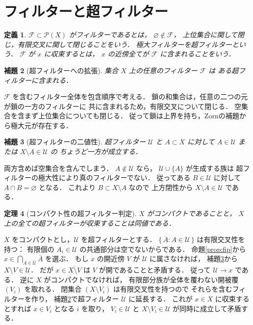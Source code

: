 \documentclass[a5paper,10pt,onecolumn]{jsarticle}
\makeatletter
\theoremstyle{mathnotetheorem}
\newtheorem{theorem}{定理}[section]
\newtheorem{definition}[theorem]{定義}
\newtheorem{lemma}[theorem]{補題}
\renewcommand{\proofname}{証明}
\renewenvironment{proof}[1][\proofname]{%
  \par\pushQED{\qed}\normalfont\topsep4\p@\@plus2\p@\relax
  \trivlist\item[\hskip\labelsep\bfseries #1]\ignorespaces
}{\popQED\endtrivlist\@endpefalse}
\makeatother
\begin{document}
\section{フィルターと超フィルター}
\begin{definition}
$\mathcal F\subset\mathcal P(X)$ がフィルターであるとは，
$\varnothing\notin\mathcal F$，
上位集合に関して閉じ，有限交叉に関して閉じることをいう．
極大フィルターを超フィルターという．
$\mathcal F$ が $x$ に収束するとは，
$x$ の近傍全てが $\mathcal F$ に含まれることをいう．
\end{definition}
\begin{lemma}[超フィルターへの拡張]\label{lem:ultra}
集合 $X$ 上の任意のフィルター $\mathcal F$ は
ある超フィルターに含まれる．
\end{lemma}
\begin{proof}
$\mathcal F$ を含むフィルター全体を包含順序で考える．
鎖の和集合は，任意の二つの元が鎖の一方のフィルターに
共に含まれるため，有限交叉について閉じる．
空集合を含まず上位集合についても閉じる．
従って鎖は上界を持ち，Zornの補題から極大元が存在する．
\end{proof}
\begin{lemma}[超フィルターの二値性]\label{lem:dichotomy}
超フィルター $\mathcal U$ と $A\subset X$ に対して
$A\in\mathcal U$ または $X\setminus A\in\mathcal U$ の
ちょうど一方が成立する．
\end{lemma}
\begin{proof}
両方含めば空集合を含んでしまう．
$A\notin\mathcal U$ なら，
$\mathcal U\cup\{A\}$ が生成する族は
超フィルターの極大性により真のフィルターでない．
従ってある $B\in\mathcal U$ に対して
$A\cap B=\varnothing$ となる．
これより $B\subset X\setminus A$ なので
上方閉性から $X\setminus A\in\mathcal U$ である．
\end{proof}
\begin{theorem}[コンパクト性の超フィルター判定]\label{thm:ultra}
$X$ がコンパクトであることと，
$X$ 上の全ての超フィルターが収束することは同値である．
\end{theorem}
\begin{proof}
$X$ をコンパクトとし，$\mathcal U$ を超フィルターとする．
$\{\,\overline A:A\in\mathcal U\,\}$ は有限交叉性を持つ：
有限個の $A_i\in\mathcal U$ の共通部分は空でないからである．
命題\ref{prop:fip}から
$x\in\bigcap_{A\in\mathcal U}\overline A$ を選ぶ．
もし $x$ の開近傍 $V$ が $\mathcal U$ に属さなければ，
補題\ref{lem:dichotomy}から $X\setminus V\in\mathcal U$．
だが $x\in\overline{X\setminus V}$ は
$V$ が開であることと矛盾する．
従って $\mathcal U\to x$ である．
逆に $X$ がコンパクトでなければ，
有限部分族が全体を覆わない開被覆 $(V_i)$ を取れる．
閉集合 $(X\setminus V_i)$ は有限交叉性を持つので
それらを含むフィルターを作り，
補題\ref{lem:ultra}で超フィルター $\mathcal U$ に延長する．
これが $x\in X$ に収束するとすれば
$x\in V_i$ となる $i$ を取り，
$V_i\in\mathcal U$ と $X\setminus V_i\in\mathcal U$
が同時に成立して矛盾する．
\end{proof}
\end{document}
